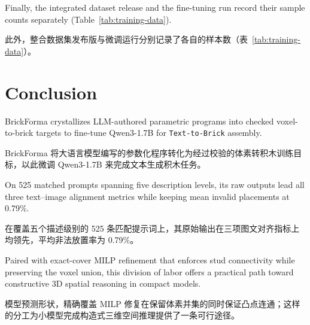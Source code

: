 \documentclass[11pt,letterpaper]{article}
\newcommand{\zh}[1]{{\chinesefont #1}}
\newcommand{\pair}[2]{\par\addvspace{4pt}\noindent
  \begin{minipage}{\linewidth}\raggedright
  #1\par\nobreak\vspace{1pt}
  {\color{translation}\chinesefont\fontsize{10.5}{15.3}\selectfont #2\par}
  \end{minipage}\par}
\begin{document}
\pair{Finally, the integrated dataset release and the fine-tuning run record their sample counts separately (Table~\ref{tab:training-data}).}{此外，整合数据集发布版与微调运行分别记录了各自的样本数（表~\ref{tab:training-data}）。}

\section{Conclusion\enspace\zh{结论}}

\pair{BrickForma crystallizes LLM-authored parametric programs into checked voxel-to-brick targets to fine-tune Qwen3-1.7B for \texttt{Text-to-Brick} assembly.}{BrickForma 将大语言模型编写的参数化程序转化为经过校验的体素转积木训练目标，以此微调 Qwen3-1.7B 来完成文本生成积木任务。}

\pair{On 525 matched prompts spanning five description levels, its raw outputs lead all three text--image alignment metrics while keeping mean invalid placements at 0.79\%.}{在覆盖五个描述级别的 525 条匹配提示词上，其原始输出在三项图文对齐指标上均领先，平均非法放置率为 0.79\%。}

\pair{Paired with exact-cover MILP refinement that enforces stud connectivity while preserving the voxel union, this division of labor offers a practical path toward constructive 3D spatial reasoning in compact models.}{模型预测形状，精确覆盖 MILP 修复在保留体素并集的同时保证凸点连通；这样的分工为小模型完成构造式三维空间推理提供了一条可行途径。}

\clearpage
\end{document}
